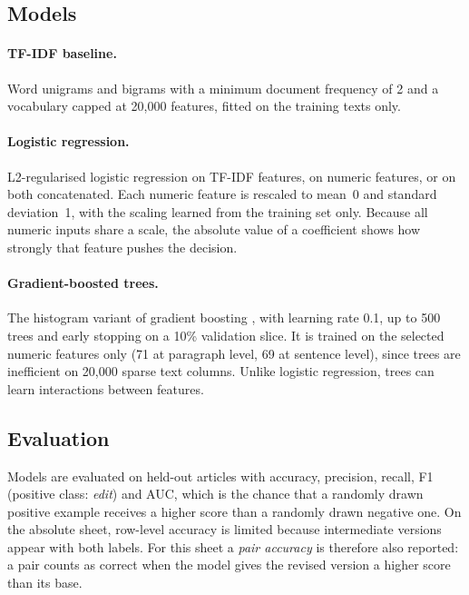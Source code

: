 \documentclass[12pt,a4paper,oneside]{report}
\begin{document}
\subsection{Models}
\paragraph{TF-IDF baseline.} Word unigrams and bigrams with a minimum document frequency of 2 and a vocabulary capped at 20{,}000 features, fitted on the training texts only.

\paragraph{Logistic regression.} L2-regularised logistic regression \citep{pedregosa2011} on TF-IDF features, on numeric features, or on both concatenated. Each numeric feature is rescaled to mean~0 and standard deviation~1, with the scaling learned from the training set only. Because all numeric inputs share a scale, the absolute value of a coefficient shows how strongly that feature pushes the decision.

\paragraph{Gradient-boosted trees.} The histogram variant of gradient boosting \citep{friedman2001}, with learning rate 0.1, up to 500 trees and early stopping on a 10\% validation slice. It is trained on the selected numeric features only (71 at paragraph level, 69 at sentence level), since trees are inefficient on 20{,}000 sparse text columns. Unlike logistic regression, trees can learn interactions between features.

\subsection{Evaluation}
Models are evaluated on held-out articles with accuracy, precision, recall, F1 (positive class: \emph{edit}) and AUC, which is the chance that a randomly drawn positive example receives a higher score than a randomly drawn negative one. On the absolute sheet, row-level accuracy is limited because intermediate versions appear with both labels. For this sheet a \emph{pair accuracy} is therefore also reported: a pair counts as correct when the model gives the revised version a higher score than its base.

\end{document}
